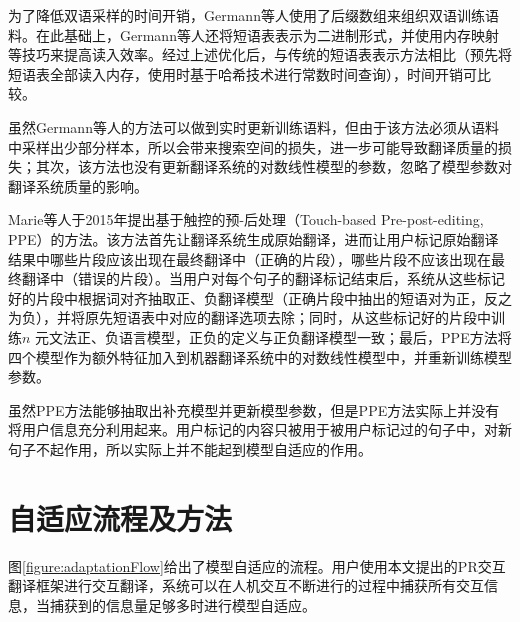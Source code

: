 \documentclass[master, winfont]{njuthesis}
\begin{document}
为了降低双语采样的时间开销，Germann等人使用了后缀数组来组织双语训练语料。在此基础上，Germann等人还将短语表表示为二进制形式，并使用内存映射等技巧来提高读入效率。经过上述优化后，与传统的短语表表示方法相比（预先将短语表全部读入内存，使用时基于哈希技术进行常数时间查询），时间开销可比较。

虽然Germann等人的方法可以做到实时更新训练语料，但由于该方法必须从语料中采样出少部分样本，所以会带来搜索空间的损失，进一步可能导致翻译质量的损失；其次，该方法也没有更新翻译系统的对数线性模型的参数，忽略了模型参数对翻译系统质量的影响。

Marie等人\cite{marietouch}于2015年提出基于触控的预-后处理（Touch-based Pre-post-editing, PPE）的方法。该方法首先让翻译系统生成原始翻译，进而让用户标记原始翻译结果中哪些片段应该出现在最终翻译中（正确的片段），哪些片段不应该出现在最终翻译中（错误的片段）。当用户对每个句子的翻译标记结束后，系统从这些标记好的片段中根据词对齐抽取正、负翻译模型（正确片段中抽出的短语对为正，反之为负），并将原先短语表中对应的翻译选项去除；同时，从这些标记好的片段中训练$n$ 元文法正、负语言模型，正负的定义与正负翻译模型一致；最后，PPE方法将四个模型作为额外特征加入到机器翻译系统中的对数线性模型中，并重新训练模型参数。

虽然PPE方法能够抽取出补充模型并更新模型参数，但是PPE方法实际上并没有将用户信息充分利用起来。用户标记的内容只被用于被用户标记过的句子中，对新句子不起作用，所以实际上并不能起到模型自适应的作用。

\section{自适应流程及方法}
\label{section:adapt}
图\ref{figure:adaptationFlow}给出了模型自适应的流程。用户使用本文提出的PR交互翻译框架进行交互翻译，系统可以在人机交互不断进行的过程中捕获所有交互信息，当捕获到的信息量足够多时进行模型自适应。
\end{document}
